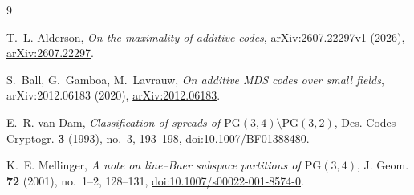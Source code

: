 \documentclass[11pt]{amsart}
\theoremstyle{remark}
\newcommand{\PG}{\mathrm{PG}}
\begin{document}
\begin{thebibliography}{9}

T.~L. Alderson,
\emph{On the maximality of additive codes},
arXiv:2607.22297v1 (2026),
\href{https://arxiv.org/abs/2607.22297}{arXiv:2607.22297}.

S.~Ball, G.~Gamboa, M.~Lavrauw,
\emph{On additive MDS codes over small fields},
arXiv:2012.06183 (2020),
\href{https://arxiv.org/abs/2012.06183}{arXiv:2012.06183}.

E.~R. van Dam,
\emph{Classification of spreads of
$\PG(3,4)\setminus\PG(3,2)$},
Des. Codes Cryptogr. \textbf{3} (1993), no.~3, 193--198,
\href{https://doi.org/10.1007/BF01388480}
{doi:10.1007/BF01388480}.

K.~E. Mellinger,
\emph{A note on line--Baer subspace partitions of $\PG(3,4)$},
J. Geom. \textbf{72} (2001), no.~1--2, 128--131,
\href{https://doi.org/10.1007/s00022-001-8574-0}
{doi:10.1007/s00022-001-8574-0}.

\end{thebibliography}
\end{document}
